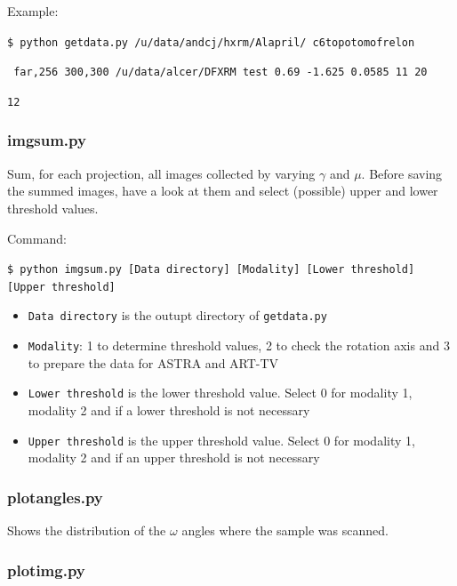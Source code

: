 \documentclass[11pt]{scrartcl}
\begin{document}
Example: 

{\texttt{\$ python getdata.py /u/data/andcj/hxrm/Al\textunderscore april/ c6\textunderscore topotomo\textunderscore frelon}}

{\texttt{ \textunderscore far,256 300,300 /u/data/alcer/DFXRM test 0.69 -1.625 0.0585 11 20}}

{\texttt{12}}

\subsubsection{img\textunderscore sum.py}
\label{sec:img_sum}

Sum, for each projection, all images collected by varying $\gamma$ and $\mu$. Before saving the summed images, have a look at them and select (possible) upper and lower threshold values.

Command: 

{\texttt{\$ python img\textunderscore sum.py [Data directory] [Modality] [Lower threshold] [Upper threshold]}}

\begin{itemize}
    \item {\texttt{Data directory}} is the outupt directory of {\texttt{getdata.py}}
    \item {\texttt{Modality}}: 1 to determine threshold values, 2 to check the rotation axis and 3 to prepare the data for {\footnotesize{ASTRA}} and {\footnotesize{ART-TV}}
    \item {\texttt{Lower threshold}} is the lower threshold value. Select 0 for modality 1, modality 2 and if a lower threshold is not necessary
    \item {\texttt{Upper threshold}} is the upper threshold value. Select 0 for modality 1, modality 2 and if an upper threshold is not necessary
    
\end{itemize}

\subsubsection{plot\textunderscore angles.py}

Shows the distribution of the $\omega$ angles where the sample was scanned. 

\subsubsection{plot\textunderscore img.py}
\end{document}
